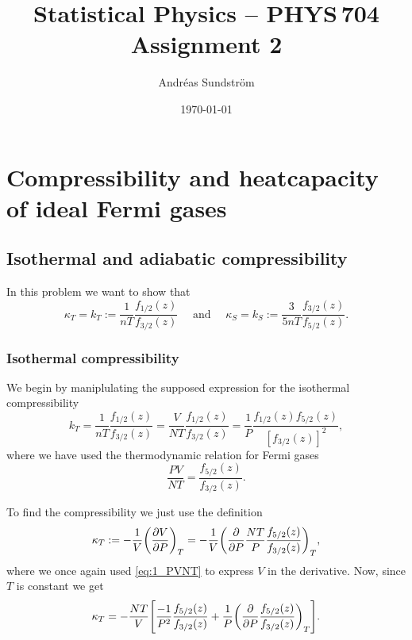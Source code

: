 \documentclass[11pt,letter, swedish, english
]{article}
\begin{document}
\title{Statistical Physics -- PHYS\,704 \\
Assignment 2}
\author{Andréas Sundström}
\date{\today}

\maketitle



\section{Compressibility and heatcapacity of ideal Fermi gases}
\subsection{Isothermal and adiabatic compressibility}
In this problem we want to show that
\begin{equation}\label{eq:1_kappa}
\kappa_T = k_T:=\frac{1}{nT}\frac{f_{1/2}(z)}{f_{3/2}(z)}
\quad\text{ and }\quad
\kappa_S = k_S:=\frac{3}{5nT}\frac{f_{3/2}(z)}{f_{5/2}(z)}.
\end{equation}


\subsubsection{Isothermal compressibility}
We begin by maniplulating the supposed expression for the isothermal
compressibility
\begin{equation}\label{eq:1_want_this_T}
k_T=\frac{1}{nT}\frac{f_{1/2}(z)}{f_{3/2}(z)}
= \frac{V}{NT}\frac{f_{1/2}(z)}{f_{3/2}(z)}
= \frac{1}{P}\frac{f_{1/2}(z)f_{5/2}(z)}{[f_{3/2}(z)]^2},
\end{equation}
where we have used the thermodynamic relation for Fermi gases
\begin{equation}\label{eq:1_PVNT}
\frac{PV}{NT}=\frac{f_{5/2}(z)}{f_{3/2}(z)}.
\end{equation}

To find the compressibility we just use the definition
\begin{equation}
\kappa_T:=-\frac{1}{V}\qty(\pdv{V}{P})_T
= -\frac{1}{V} \qty(\pdv{P} \frac{NT}{P}\frac{f_{5/2}(z)}{f_{3/2}(z)})_T,
\end{equation}
where we once again used \eqref{eq:1_PVNT} to express $V$ in the
derivative. Now, since $T$ is constant we get
\begin{equation}\label{eq:1_k_T_2}
\kappa_T
= -\frac{NT}{V} \qty[
\frac{-1}{P^2}\frac{f_{5/2}(z)}{f_{3/2}(z)}
+\frac{1}{P}\qty(\pdv{P}
\frac{f_{5/2}(z)}{f_{3/2}(z)}
)_T].
\end{equation}
\end{document}
